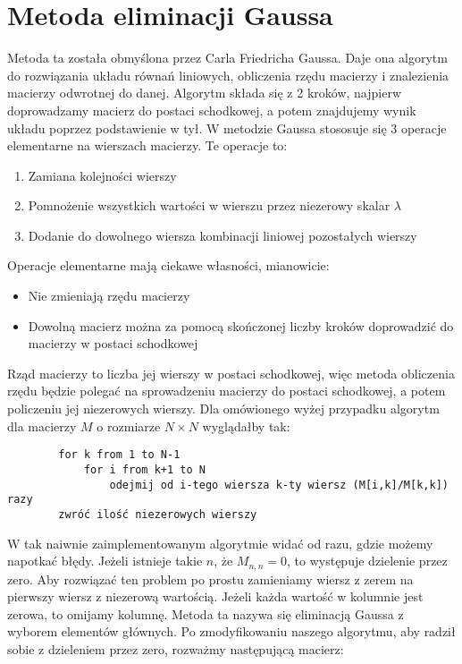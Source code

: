 \documentclass[a4paper,10pt]{article}
\begin{document}
\section{Metoda eliminacji Gaussa}
	Metoda ta została obmyślona przez Carla Friedricha Gaussa. Daje ona algorytm do rozwiązania układu równań liniowych,
	obliczenia rzędu macierzy i znalezienia macierzy odwrotnej do danej. Algorytm składa się z 2 kroków, najpierw doprowadzamy
	macierz do postaci schodkowej, a potem znajdujemy wynik układu poprzez podstawienie w tył.
	W metodzie Gaussa stososuje się 3 operacje elementarne na wierszach macierzy. Te operacje to:
	\begin{enumerate}
		\item Zamiana kolejności wierszy
		\item Pomnożenie wszystkich wartości w wierszu przez niezerowy skalar $\lambda$
		\item Dodanie do dowolnego wiersza kombinacji liniowej pozostałych wierszy
	\end{enumerate}
	Operacje elementarne mają ciekawe własności, mianowicie:
	\begin{itemize}
		\item Nie zmieniają rzędu macierzy
		\item Dowolną macierz można za pomocą skończonej liczby kroków doprowadzić do macierzy w postaci schodkowej
	\end{itemize}
	Rząd macierzy to liczba jej wierszy w postaci schodkowej, więc metoda obliczenia rzędu będzie polegać na sprowadzeniu macierzy
	do postaci schodkowej, a potem policzeniu jej niezerowych wierszy.
		Dla omówionego wyżej przypadku algorytm dla macierzy $M$ o rozmiarze $N \times N$ wyglądałby tak:
	\begin{verbatim}
		for k from 1 to N-1
		    for i from k+1 to N
		        odejmij od i-tego wiersza k-ty wiersz (M[i,k]/M[k,k]) razy
		zwróć ilość niezerowych wierszy
	\end{verbatim}
		W tak naiwnie zaimplementowanym algorytmie widać od razu, gdzie możemy napotkać błędy. Jeżeli istnieje takie $n$, że $M_{n,n} = 0$,
	to występuje dzielenie przez zero. Aby rozwiązać ten problem po prostu zamieniamy wiersz z zerem na pierwszy wiersz z niezerową wartością.
	Jeżeli każda wartość w kolumnie jest zerowa, to omijamy kolumnę. Metoda ta nazywa się eliminacją Gaussa z wyborem elementów głównych.
		Po zmodyfikowaniu naszego algorytmu, aby radził sobie z dzieleniem przez zero, rozważmy następującą macierz:
	
\end{document}
